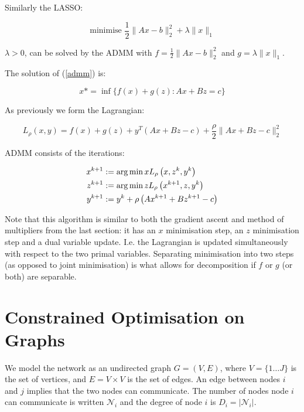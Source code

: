 \documentclass[titlepage]{article}
\begin{document}
\begin{example}
Similarly the LASSO:

\begin{equation}
\text{minimise } \frac{1}{2}\|Ax-b\|_2^2 + \lambda\|x\|_1
\end{equation}

\(\lambda > 0\), can be solved by the ADMM with \(f = \frac{1}{2}\|Ax-b\|_2^2\) and \(g = \lambda\|x\|_1\).

\end{example}

The solution of (\ref{admm}) is:

\begin{equation}
x* = \inf\{f\left( x \right) + g\left(z\right) : Ax +Bz = c\}
\end{equation}

As previously we form the Lagrangian:

\begin{equation}
L_\rho\left(x,y\right) = f\left( x \right) + g\left(z\right) + y^T\left(Ax+Bz-c\right) + \frac{\rho}{2}\|Ax+Bz-c\|_2^2
\end{equation}

ADMM consists of the iterations:

\begin{align}
x^{k+1} &:= \operatorname*{arg\,min}{x} L_\rho\left(x,z^k,y^k\right)\\
z^{k+1} &:= \operatorname*{arg\,min}{z} L_\rho\left(x^{k+1},z,y^k\right)\\
y^{k+1} &:= y^{k} + \rho \left(Ax^{k+1} + Bz^{k+1} - c\right)
\label{admm_algo}
\end{align}

Note that this algorithm is similar to both the gradient ascent and method of multipliers from the last section: it has an \(x\) minimisation step, an \(z\) minimisation step and a dual variable update. I.e. the Lagrangian is updated simultaneously with respect to the two primal variables. Separating minimisation into two steps (as opposed to joint minimisation) is what allows for decomposition if \(f\) or \(g\) (or both) are separable. 

\section{Constrained Optimisation on Graphs}
We model the network as an undirected graph \(G = \left(V,E\right)\), where \(V = \{1 \ldots J\}\) is the set of vertices, and \(E = V \times V\) is the set of edges. An edge between nodes \(i\) and \(j\) implies that the two nodes can communicate. The number of nodes node \(i\) can communicate is written \(\mathcal{N}_i\) and the degree of node \(i\) is \(D_i = |\mathcal{N}_i|\). 
\end{document}
